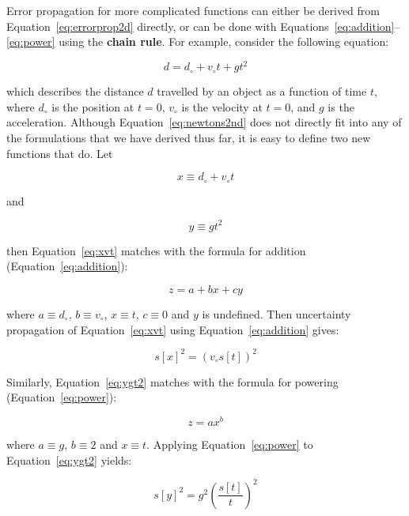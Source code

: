 \begin{enumerate}
  Error propagation for more complicated functions can either be derived
  from Equation~\ref{eq:errorprop2d} directly, or can be done with
  Equations~\ref{eq:addition}--\ref{eq:power} using the \textbf{chain
    rule}. For example, consider the following equation:

  \begin{equation}
    d = d_\circ + v_\circ t + g t^2
    \label{eq:newtons2nd}
  \end{equation}

  \noindent which describes the distance $d$ travelled by an object as a
  function of time $t$, where $d_\circ$ is the position at $t=0$,
  $v_\circ$ is the velocity at $t=0$, and $g$ is the acceleration.
  Although Equation~\ref{eq:newtons2nd} does not directly fit into any
  of the formulations that we have derived thus far, it is easy to
  define two new functions that do. Let

  \begin{equation}
    x \equiv d_\circ + v_\circ t
    \label{eq:xvt}
  \end{equation}

  \noindent and

  \begin{equation}
    y \equiv g t^2
    \label{eq:ygt2}
  \end{equation}

  \noindent then Equation~\ref{eq:xvt} matches with the formula for
  addition (Equation~\ref{eq:addition}):

  \[
  z = a + bx + cy
  \]

  \noindent where $a \equiv d_\circ$, $b \equiv v_\circ$, $x \equiv t$,
  $c \equiv 0$ and $y$ is undefined. Then uncertainty propagation of
  Equation~\ref{eq:xvt} using Equation~\ref{eq:addition} gives:

  \begin{equation}
    s[x]^2 = \left(v_\circ s[t]\right)^2
    \label{eq:sx}
  \end{equation}

  Similarly, Equation~\ref{eq:ygt2} matches with the formula for
  powering (Equation~\ref{eq:power}):

  \[
  z = a x^b
  \]

  \noindent where $a \equiv g$, $b \equiv 2$ and $x \equiv t$. Applying
  Equation~\ref{eq:power} to Equation~\ref{eq:ygt2} yields:

  \begin{equation}
    s[y]^2 = g^2 \left(\frac{s[t]}{t}\right)^2
    \label{eq:sy}
  \end{equation}


\end{enumerate}
